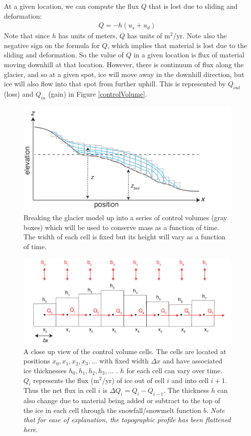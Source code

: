 \documentclass[11pt, oneside]{article}   	%
\begin{document}
At a given location, we can compute the flux $Q$ that is lost due to sliding and deformation:
\begin{eqnarray}
	Q = -h ( u_s + u_d)
	\label{eq:Q}
\end{eqnarray}
Note that  since $h$ has units of meters, $Q$ has units of m$^2$/yr.  Note also the negative sign on the formula for $Q$, which implies that material is lost due to the sliding and deformation.   So the value of $Q$ in a given location is flux of material moving downhill at that location. However, there is continuum of flux along the glacier, and so at a given spot, ice will move away in the downhill direction, but ice will also flow into that spot from further uphill.  This is represented by $Q_{out}$ (loss) and $Q_{in}$ (gain) in Figure \ref{controlVolume}. 

\begin{figure}[htbp]
\begin{center}
\includegraphics[width=.8\textwidth]{glacier_volumes.pdf}
\caption{Breaking the glacier model up into a series of control volumes (gray boxes) which will be used to conserve mass as a function of time. The width of each cell is fixed but its height will vary as a function of time.}
\label{fig:volumes}
\end{center}
\end{figure}

\begin{figure}[htbp]
\begin{center}
\includegraphics[width=.8\textwidth]{cells.pdf}
\caption{A close up view of the control volume cells. The cells are located at positions $x_0,x_1,x_2,x_3,...$ with fixed width $\Delta x$ and have associated ice thicknesses $h_0,h_1,h_2,h_3,...$ .  $h$ for each cell can vary over time. $Q_i$ represents the flux (m$^2$/yr) of ice out of cell $i$ and into cell $i+1$. Thus the net flux in cell $i$ is $\Delta Q_i =  Q_i - Q_{i-1}$.   The thickness $h$ can also change due to material being added or subtract to the top of the ice in each cell through the snowfall/snowmelt function $b$. {\it Note that for ease of explanation, the topographic profile has been flattened here}. }
\label{fig:cells}
\end{center}
\end{figure}
\end{document}
